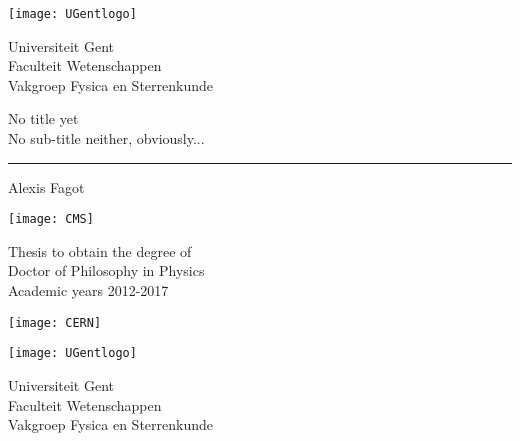 \documentclass[10pt,a4paper,twoside,dutch,english]{book}                %
\begin{document}
\latintext
\graphicspath{{fig/}}

% 
 \thispagestyle{empty}   %
% 
 \noindent
 \begin{minipage}{3cm}%
   \texttt{[image: UGentlogo]}%
 \end{minipage}\hfill
 \begin{minipage}{8cm}
 \raggedleft
 \textsf{Universiteit Gent\\
 Faculteit Wetenschappen\\
 Vakgroep Fysica en Sterrenkunde}
 \end{minipage}
% 
\bigskip
   \begin{flushleft}
     \Large \textsf{No title yet}\\
     \vspace{0.1in}\large{\textsf{No sub-title neither, obviously...}}%
   \end{flushleft}
 \hrule
% 
 \bigskip
   \LARGE\noindent \textsf{Alexis Fagot} \hfill
 \bigskip
 
 \normalsize
% 
 \vfill
 \begin{minipage}{2.0cm}%
     \texttt{[image: CMS]}%
 \end{minipage}\hfill
 \begin{minipage}{6cm}
 \centering
 \textsf{Thesis to obtain the degree of\\
 Doctor of Philosophy in Physics\\
 Academic years 2012-2017}
 \end{minipage}\hfill
 \begin{minipage}{2.0cm}%
     \texttt{[image: CERN]}%
 \end{minipage}\hfill



\clearpage{\pagestyle{empty}\cleardoublepage}
\thispagestyle{empty}

\normalsize

\noindent
\begin{minipage}{3cm}%
   \texttt{[image: UGentlogo]}%
 \end{minipage}\hfill
 \begin{minipage}{8cm}
 \raggedleft
 \textsf{Universiteit Gent\\
 Faculteit Wetenschappen\\
 Vakgroep Fysica en Sterrenkunde}
 \end{minipage}
\\[2cm]
\end{document}

